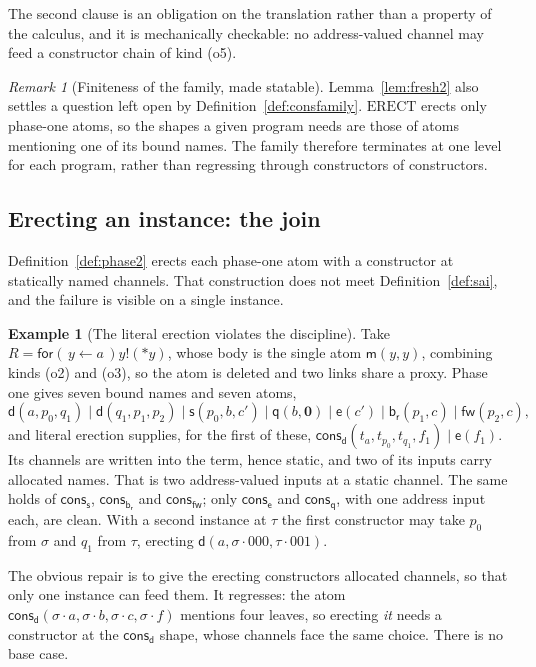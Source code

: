 \documentclass[11pt]{article}
\theoremstyle{plain}
\theoremstyle{definition}
\newtheorem{example}[theorem]{Example}
\theoremstyle{remark}
\newtheorem{remark}[theorem]{Remark}
\newcommand{\drp}[1]{{*}#1}
\newcommand{\inp}[3]{\mathsf{for}(\,#1 \leftarrow #2\,)#3}
\newcommand{\out}[2]{#1!(#2)}
\newcommand{\nil}{\mathbf{0}}
\newcommand{\mm}{\mathsf{m}}
\newcommand{\dd}{\mathsf{d}}
\newcommand{\fw}{\mathsf{fw}}
\newcommand{\br}{\mathsf{b}_{\mathsf{r}}}
\newcommand{\sy}{\mathsf{s}}
\newcommand{\ev}{\mathsf{e}}
\newcommand{\qq}{\mathsf{q}}
\newcommand{\cons}{\mathsf{cons}}
\begin{document}
The second clause is an obligation on the translation rather than a property
of the calculus, and it is mechanically checkable: no address-valued channel
may feed a constructor chain of kind (o5).

\begin{remark}[Finiteness of the family, made statable]
\label{rem:familyfinite}
Lemma~\ref{lem:fresh2} also settles a question left open by
Definition~\ref{def:consfamily}. $\mathrm{ERECT}$ erects only phase-one
atoms, so the shapes a given program needs are those of atoms mentioning one
of its bound names. The family therefore terminates at one level for each
program, rather than regressing through constructors of constructors.
\end{remark}

\subsection{Erecting an instance: the join}
\label{sec:join}

Definition~\ref{def:phase2} erects each phase-one atom with a constructor at
statically named channels. That construction does not meet
Definition~\ref{def:sai}, and the failure is visible on a single instance.

\begin{example}[The literal erection violates the discipline]
\label{ex:literalfails}
Take $R = \inp{y}{a}{\out{y}{\drp{y}}}$, whose body is the single atom
$\mm(y,y)$, combining kinds (o2) and (o3), so the atom is deleted and two
links share a proxy. Phase one gives seven bound names and seven atoms,
\[
  \dd(a,p_{0},q_{1}) \mid \dd(q_{1},p_{1},p_{2}) \mid \sy(p_{0},b,c') \mid
  \qq(b,\nil) \mid \ev(c') \mid \br(p_{1},c) \mid \fw(p_{2},c),
\]
and literal erection supplies, for the first of these,
$\cons_{\dd}(t_{a},t_{p_{0}},t_{q_{1}},f_{1}) \mid \ev(f_{1})$. Its channels
are written into the term, hence static, and two of its inputs carry
allocated names. That is two address-valued inputs at a static channel. The
same holds of $\cons_{\sy}$, $\cons_{\br}$ and $\cons_{\fw}$; only
$\cons_{\ev}$ and $\cons_{\qq}$, with one address input each, are clean. With
a second instance at $\tau$ the first constructor may take $p_{0}$ from
$\sigma$ and $q_{1}$ from $\tau$, erecting $\dd(a,\sigma\!\cdot\!000,
\tau\!\cdot\!001)$.
\end{example}

The obvious repair is to give the erecting constructors allocated channels,
so that only one instance can feed them. It regresses: the atom
$\cons_{\dd}(\sigma\!\cdot\!a,\sigma\!\cdot\!b,\sigma\!\cdot\!c,
\sigma\!\cdot\!f)$ mentions four leaves, so erecting \emph{it} needs a
constructor at the $\cons_{\dd}$ shape, whose channels face the same choice.
There is no base case.
\end{document}

